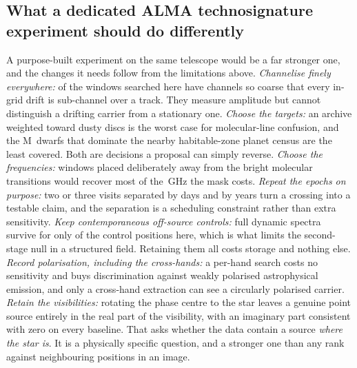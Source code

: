 \subsection{What a dedicated ALMA technosignature experiment should do
differently}
\label{sec:future}

A purpose-built experiment on the same telescope would be a far stronger
one, and the changes it needs follow from the limitations above.
\emph{Channelise finely everywhere:} \NCoarse{} of the \NWindows{}
windows searched here have channels so coarse that every in-grid drift is
sub-channel over a track. They measure amplitude but cannot distinguish a
drifting carrier from a stationary one. \emph{Choose the targets:} an
archive weighted toward dusty discs is the worst case for molecular-line
confusion, and the M~dwarfs that dominate the nearby habitable-zone planet
census are the least covered. Both are decisions a proposal can simply
reverse. \emph{Choose the frequencies:} windows placed deliberately away
from the bright molecular transitions would recover most of the
\MaskLostGHz\,GHz the mask costs. \emph{Repeat the epochs on purpose:} two
or three visits separated by days and by years turn a crossing into a
testable claim, and the separation is a scheduling constraint rather than
extra sensitivity. \emph{Keep contemporaneous off-source controls:} full dynamic spectra
survive for only \LNNRetained{} of the \NCtrl{} control positions here,
which is what limits the second-stage null in a structured field. Retaining
them all costs storage and nothing else. \emph{Record
polarisation, including the cross-hands:} a per-hand search costs no
sensitivity and buys discrimination against weakly polarised astrophysical
emission, and only a cross-hand extraction can see a circularly polarised
carrier. \emph{Retain the visibilities:} rotating the phase centre to the star
leaves a genuine point source entirely in the real part of the visibility,
with an imaginary part consistent with zero on every baseline. That asks
whether the data contain a source \emph{where the star is}. It is a
physically specific question, and a stronger one than any rank against
neighbouring positions in an image.

